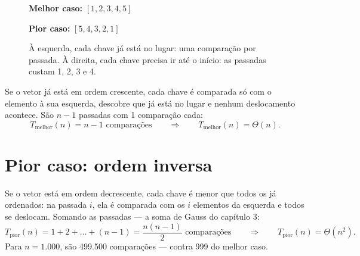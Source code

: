 \begin{figure}[!htb]
\centering
\begin{minipage}{0.48\textwidth}\centering
{}
\par\small\textbf{Melhor caso:} $[1, 2, 3, 4, 5]$
\end{minipage}\hfill
\begin{minipage}{0.48\textwidth}\centering
{}
\par\small\textbf{Pior caso:} $[5, 4, 3, 2, 1]$
\end{minipage}
\caption{À esquerda, cada chave já está no lugar: uma comparação por passada. À direita, cada
chave precisa ir até o início: as passadas custam 1, 2, 3 e 4.}
\end{figure}

Se o vetor já está em ordem crescente, cada chave é comparada só com o elemento à sua esquerda,
descobre que já está no lugar e nenhum deslocamento acontece. São $n - 1$ passadas com 1
comparação cada:
\[
T_{\text{melhor}}(n) = n - 1 \text{ comparações} \qquad\Longrightarrow\qquad T_{\text{melhor}}(n) = \Theta(n).
\]

\section{Pior caso: ordem inversa}

Se o vetor está em ordem decrescente, cada chave é menor que todos os já ordenados: na passada
$i$, ela é comparada com os $i$ elementos da esquerda e todos se deslocam. Somando as passadas —
a soma de Gauss do capítulo 3:
\[
T_{\text{pior}}(n) = 1 + 2 + \dots + (n-1) = \frac{n(n-1)}{2} \text{ comparações}
\qquad\Longrightarrow\qquad T_{\text{pior}}(n) = \Theta(n^2).
\]
Para $n = 1.000$, são 499.500 comparações — contra 999 do melhor caso.

